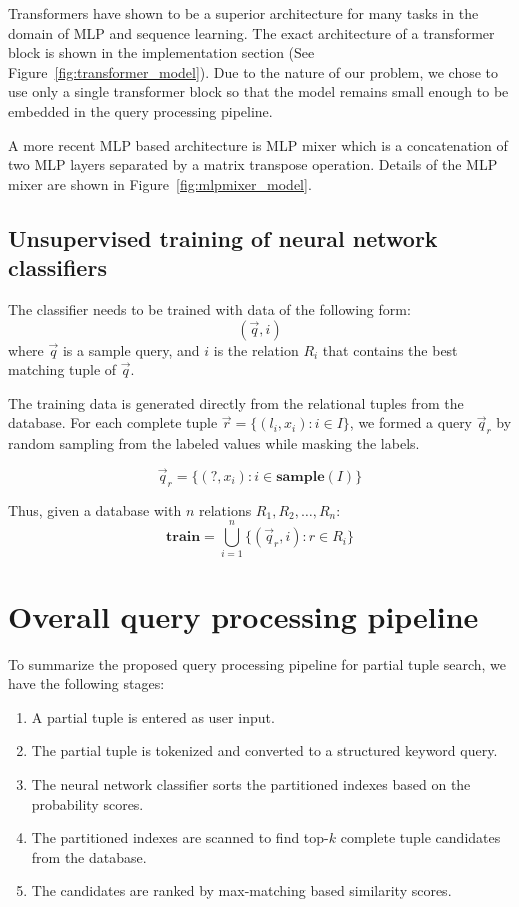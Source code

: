 \documentclass[conference]{IEEEtran}
\begin{document}
Transformers have shown to be a superior architecture for many tasks in the domain of MLP and sequence learning.  The exact architecture of a transformer block is shown in the implementation section (See Figure~\ref{fig:transformer_model}).  Due to the nature of our problem, we chose to use only a single transformer block so that the model remains small enough to be embedded in the query processing pipeline.

A more recent MLP based architecture is MLP mixer which is a concatenation of two MLP layers separated by a matrix transpose operation.  Details of the MLP mixer are shown in Figure~\ref{fig:mlpmixer_model}.

\subsection{Unsupervised training of neural network classifiers}

The classifier needs to be trained with data of the following form:
$$
(\vec q, i)
$$
where $\vec q$ is a sample query, and $i$ is the relation $R_i$ that contains the best matching
tuple of $\vec q$.

The training data is generated directly from the relational tuples from the database.  For each complete tuple $\vec r = \{(l_i, x_i): i\in I\}$, we formed a query $\vec q_r$ by random sampling from
the labeled values while masking the labels.

$$
\vec q_r = \{(?, x_i): i\in\mathbf{sample}(I)\}
$$

Thus, given a database with $n$ relations $R_1, R_2, \dots, R_n$:
$$
\mathbf{train} = \bigcup_{i=1}^n\{(\vec q_r, i): r\in R_i\}
$$

\section{Overall query processing pipeline}

To summarize the proposed query processing pipeline for partial tuple search, we have the following stages:

\begin{enumerate}
    \item A partial tuple is entered as user input.
    \item The partial tuple is tokenized and converted to a structured keyword query.
    \item The neural network classifier sorts the partitioned indexes based on the probability scores.
    \item The partitioned indexes are scanned to find top-$k$ complete tuple candidates from the database.
    \item The candidates are ranked by max-matching based similarity scores.
\end{enumerate}
\end{document}
